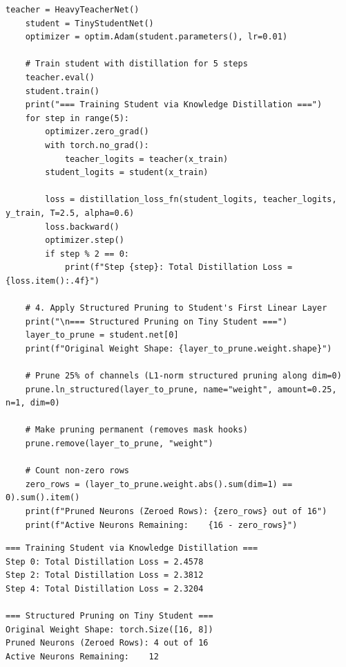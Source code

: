 \begin{lstlisting}[style=pythonstyle, caption={Knowledge distillation training loop and structured pruning in PyTorch.}, label={lst:compression_demo}]
    teacher = HeavyTeacherNet()
    student = TinyStudentNet()
    optimizer = optim.Adam(student.parameters(), lr=0.01)

    # Train student with distillation for 5 steps
    teacher.eval()
    student.train()
    print("=== Training Student via Knowledge Distillation ===")
    for step in range(5):
        optimizer.zero_grad()
        with torch.no_grad():
            teacher_logits = teacher(x_train)
        student_logits = student(x_train)
        
        loss = distillation_loss_fn(student_logits, teacher_logits, y_train, T=2.5, alpha=0.6)
        loss.backward()
        optimizer.step()
        if step % 2 == 0:
            print(f"Step {step}: Total Distillation Loss = {loss.item():.4f}")

    # 4. Apply Structured Pruning to Student's First Linear Layer
    print("\n=== Structured Pruning on Tiny Student ===")
    layer_to_prune = student.net[0]
    print(f"Original Weight Shape: {layer_to_prune.weight.shape}")
    
    # Prune 25% of channels (L1-norm structured pruning along dim=0)
    prune.ln_structured(layer_to_prune, name="weight", amount=0.25, n=1, dim=0)
    
    # Make pruning permanent (removes mask hooks)
    prune.remove(layer_to_prune, "weight")
    
    # Count non-zero rows
    zero_rows = (layer_to_prune.weight.abs().sum(dim=1) == 0).sum().item()
    print(f"Pruned Neurons (Zeroed Rows): {zero_rows} out of 16")
    print(f"Active Neurons Remaining:    {16 - zero_rows}")
\end{lstlisting}

\begin{lstlisting}[style=outputstyle, caption={Output of the distillation and pruning Python script.}]
=== Training Student via Knowledge Distillation ===
Step 0: Total Distillation Loss = 2.4578
Step 2: Total Distillation Loss = 2.3812
Step 4: Total Distillation Loss = 2.3204

=== Structured Pruning on Tiny Student ===
Original Weight Shape: torch.Size([16, 8])
Pruned Neurons (Zeroed Rows): 4 out of 16
Active Neurons Remaining:    12
\end{lstlisting}

